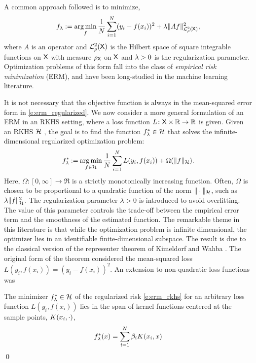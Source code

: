 A common approach followed is to minimize,
\begin{equation}
f_\reg := \argmin_f \frac{1}{N}\sum_{i=1}^N (y_i - f(x_i))^2 + \reg \|A f \|^2_{\mathcal{L}_{\pr}^2(\state)},
\label{e:erm_regularized}
\end{equation}
where $A$ is an operator and $\mathcal{L}^2_{\rho}({\sf X})$ is the Hilbert space of square integrable functions on ${\sf X}$ with measure $\rho_{\sf X}$ on ${\sf X}$ and $\lambda>0$ is the regularization parameter. Optimization problems of this form fall into the class of \textit{empirical risk minimization} (ERM), and have been long-studied in the machine learning literature.   

It is not necessary that the objective function is always in the mean-squared error form in \eqref{e:erm_regularized}. We now consider a more general formulation of an ERM in an RKHS setting, where a loss function $L \colon  {\sf X}\times \mathbb{R} \to\mathbb{R}$ is given.   Given an RKHS ${\cal H}$ ,   the goal is to find the function $f_\lambda^*\in{\cal H}$ that solves the infinite-dimensional regularized optimization problem:
\begin{equation}
f_\reg^* \eqdef \argmin_{f\in\clH} \frac{1}{N} \sum_{i=1}^N L(y_i,  f(x_i))     + \Omega(\| f\|_{\clH}).
\label{e:erm_rkhs}
\end{equation}
Here, $\Omega : [0, \infty] \to \Re$ is a strictly monotonically increasing function. Often, $\Omega$ is chosen to be proportional to a quadratic function of the norm $\|\cdot\|_{\cal H}$, such as $\lambda \|f\|^2_{\cal H}$.
The regularization parameter $\lambda>0$ is introduced to avoid overfitting. The value of this parameter controls the trade-off between the empirical error term and the smoothness of the estimated function.  
The remarkable theme in this literature is that while the optimization problem is infinite dimensional,  the optimizer lies in an identifiable finite-dimensional subspace.
The result is due to the classical version of the representer theorem of Kimeldorf and Wahba \cite{kimwah71}. The original form of the theorem considered the mean-squared loss $L(y_i, f(x_i)) = (y_i - f(x_i))^2$. An extension to non-quadratic loss functions was 
\begin{theorem}
\label{theorem:rep_theorem}
The minimizer $f_\lambda^* \in {\cal H}$ of the regularized risk \eqref{e:erm_rkhs} for an arbitrary loss function $L(y_i, f(x_i))$ lies in the span of kernel functions centered at the sample points, $K(x_i, \cdot)$,
\[
f_\lambda^*(x) = \sum_{i=1}^N \beta_i K(x_i, x)
\]
\qed
\end{theorem}
